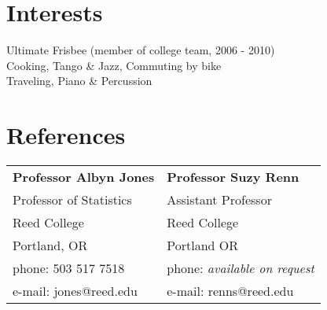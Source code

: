 \documentclass[margin,line]{resume}
\begin{document}
\begin{resume}
\newpage
    \section{\mysidestyle Interests} 

Ultimate Frisbee (member of college team, 2006 - 2010) \\
Cooking, Tango \& Jazz, Commuting by bike \\
Traveling, Piano \& Percussion \\







\section{\mysidestyle References} 

\begin{tabular}{@{}p{6cm}p{6cm}}
\textbf{Professor Albyn Jones}       &  \textbf{Professor Suzy Renn}                   \\
Professor of Statistics                              &  Assistant Professor                       \\
Reed College                     &  Reed College                 \\
Portland, OR           &  Portland OR        \\
phone: 503 517 7518    &  phone: \textsl{available on request}     \\
e-mail: jones@reed.edu   &  e-mail: renns@reed.edu    \\
\end{tabular}




\end{resume}
\end{document}
